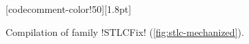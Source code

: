 \begin{figure}
\begin{minipage}{\textwidth}
\begin{multicols}{2}
[codecomment-color!50][1.8pt]

\end{multicols}
\end{minipage}

\vspace{-12pt}

\caption{Compilation of family \lsti!STLCFix! (\cref{fig:stlc-mechanized}).}
\label{fig:stlcfix-compiled}
\end{figure}